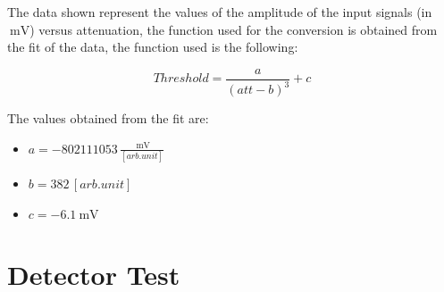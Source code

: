 \begin{figure}[hbtp]
\centering
{}
\end{figure}

The data shown represent the values of the amplitude of the input signals (in $\SI{}{\milli \volt}$) versus attenuation, the function used for the conversion is obtained from the fit of the data, the function used is the following: 

\begin{equation}
Threshold = \dfrac{a}{(att - b)^{3}} + c
\end{equation}

The values obtained from the fit are:

\begin{itemize}
\item $a = - 802111053 \, \frac{\SI{}{\milli \volt}}{[arb.unit]}$
\item $b = 382 \, [arb. unit]$
\item $c =  \SI{-6.1}{\milli \volt}$
\end{itemize}

\section{Detector Test}

